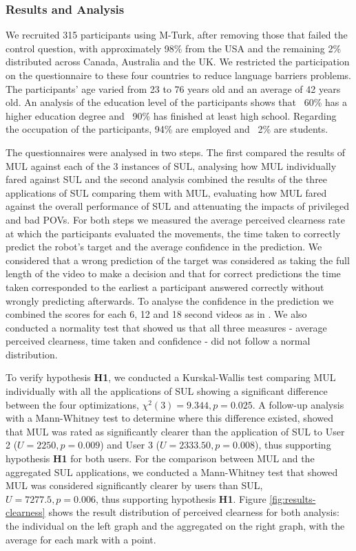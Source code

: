 \documentclass[letterpaper, 10 pt, conference]{ieeeconf}
\begin{document}
\subsubsection{\textbf{Results and Analysis}}
We recruited 315 participants using \ac{M-Turk}, after removing those that failed the control question, with approximately 98\% from the USA and the remaining 2\% distributed across Canada, Australia and the UK. We restricted the participation on the questionnaire to these four countries to reduce language barriers problems. The participants' age varied from 23 to 76 years old and an average of 42 years old. An analysis of the education level of the participants shows that ~60\% has a higher education degree and ~90\% has finished at least high school. Regarding the occupation of the participants, 94\% are employed and ~2\% are students.

The questionnaires were analysed in two steps. The first compared the results of \ac{MUL} against each of the 3 instances of \ac{SUL}, analysing how \ac{MUL} individually fared against \ac{SUL} and the second analysis combined the results of the three applications of \ac{SUL} comparing them with \ac{MUL}, evaluating how \ac{MUL} fared against the overall performance of \ac{SUL} and attenuating the impacts of privileged and bad \ac{POV}s. For both steps we measured the average perceived clearness rate at which the participants evaluated the movements, the time taken to correctly predict the robot's target and the average confidence in the prediction. We considered that a wrong prediction of the target was considered as taking the full length of the video to make a decision and that for correct predictions the time taken corresponded to the earliest a participant answered correctly without wrongly predicting afterwards. To analyse the confidence in the prediction we combined the scores for each 6, 12 and 18 second videos as in \cite{nikolaidis2016hri}. We also conducted a normality test that showed us that all three measures - average perceived clearness, time taken and confidence - did not follow a normal distribution.

To verify hypothesis \textbf{H1}, we conducted a Kurskal-Wallis test comparing \ac{MUL} individually with all the applications of \ac{SUL} showing a significant difference between the four optimizations, $\chi^2(3)=9.344, p=0.025$. A follow-up analysis with a Mann-Whitney test to determine where this difference existed, showed that \ac{MUL} was rated as significantly clearer than the application of \ac{SUL} to User 2 ($U=2250, p=0.009$) and User 3 ($U=2333.50, p=0.008$), thus supporting hypothesis \textbf{H1} for both users. For the comparison between \ac{MUL} and the aggregated \ac{SUL} applications, we conducted a Mann-Whitney test that showed \ac{MUL} was considered significantly clearer by users than \ac{SUL}, $U=7277.5, p=0.006$, thus supporting hypothesis \textbf{H1}. Figure \ref{fig:results-clearness} shows the result distribution of perceived clearness for both analysis: the individual on the left graph and the aggregated on the right graph, with the average for each mark with a point.
\end{document}
